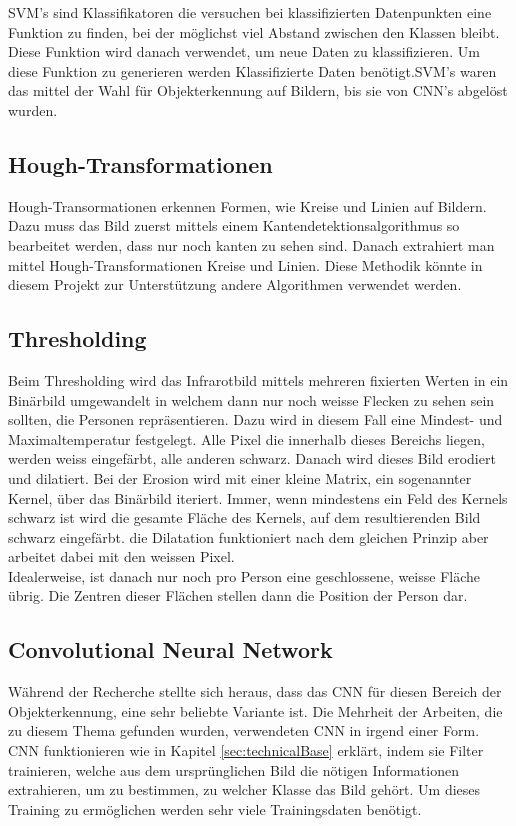 \gls{SVM}'s sind Klassifikatoren die versuchen bei klassifizierten Datenpunkten eine Funktion zu finden, bei der möglichst viel Abstand zwischen den Klassen bleibt. Diese Funktion wird danach verwendet, um neue Daten zu klassifizieren. Um diese Funktion zu generieren werden Klassifizierte Daten benötigt.\gls{SVM}'s waren das mittel der Wahl für Objekterkennung auf Bildern, bis sie von \gls{CNN}'s abgelöst wurden.

\subsection{Hough-Transformationen}

Hough-Transormationen erkennen Formen, wie Kreise und Linien auf Bildern. Dazu muss das Bild zuerst mittels einem Kantendetektionsalgorithmus so bearbeitet werden, dass nur noch kanten zu sehen sind. Danach extrahiert man mittel Hough-Transformationen Kreise und Linien. Diese Methodik könnte in diesem Projekt zur Unterstützung andere Algorithmen verwendet werden.


\subsection{Thresholding}

Beim Thresholding wird das Infrarotbild mittels mehreren fixierten Werten in ein Binärbild umgewandelt in welchem dann nur noch weisse Flecken zu sehen sein sollten, die Personen repräsentieren. Dazu wird in diesem Fall eine Mindest- und Maximaltemperatur festgelegt. Alle Pixel die innerhalb dieses Bereichs liegen, werden weiss eingefärbt, alle anderen schwarz. Danach wird dieses Bild erodiert und dilatiert. Bei der Erosion wird mit einer kleine Matrix, ein sogenannter Kernel, über das Binärbild iteriert. Immer, wenn mindestens ein Feld des Kernels schwarz ist wird die gesamte Fläche des Kernels, auf dem resultierenden Bild schwarz eingefärbt. die Dilatation funktioniert nach dem gleichen Prinzip aber arbeitet dabei mit den weissen Pixel.\\
Idealerweise, ist danach nur noch pro Person eine geschlossene, weisse Fläche übrig. Die Zentren dieser Flächen stellen dann die Position der Person dar.

\subsection{Convolutional Neural Network}

Während der Recherche stellte sich heraus, dass das \gls{CNN} für diesen Bereich der Objekterkennung, eine sehr beliebte Variante ist. Die Mehrheit der Arbeiten, die zu diesem Thema gefunden wurden, verwendeten \gls{CNN} in irgend einer Form.\\
\gls{CNN} funktionieren wie in Kapitel \ref{sec:technicalBase} erklärt, indem sie Filter trainieren, welche aus dem ursprünglichen Bild die nötigen Informationen extrahieren, um zu bestimmen, zu welcher Klasse das Bild gehört. Um dieses Training zu ermöglichen werden sehr viele Trainingsdaten benötigt.

